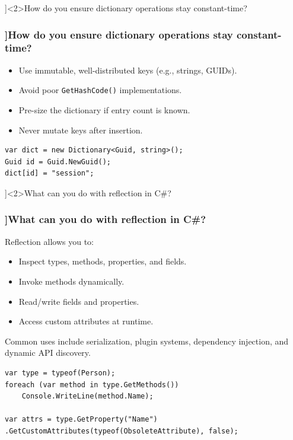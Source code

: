 \QuestionSlide[\CategoryBadge[CollColor!20]{Collections}]<2>{How do you ensure dictionary operations stay constant-time?}
\begin{frame}[fragile]
  \frametitle{\AnswerTitle[\CategoryBadge[CollColor!20]{Collections}]{How do you ensure dictionary operations stay constant-time?}}

  {\footnotesize
    \begin{itemize}
      \item Use immutable, well-distributed keys (e.g., strings, GUIDs).
      \item Avoid poor \texttt{GetHashCode()} implementations.
      \item Pre-size the dictionary if entry count is known.
      \item Never mutate keys after insertion.
    \end{itemize}
  }

  \begin{verbatim}
var dict = new Dictionary<Guid, string>();
Guid id = Guid.NewGuid();
dict[id] = "session";
  \end{verbatim}
\end{frame}

\QuestionSlide[\CategoryBadge[MetaColor!20]{Metaprogramming}]<2>{What can you do with reflection in C\#?}
\begin{frame}[fragile]
  \frametitle{\AnswerTitle[\CategoryBadge[MetaColor!20]{Metaprogramming}]{What can you do with reflection in C\#?}}

  {\footnotesize
    Reflection allows you to:
    \begin{itemize}
      \item Inspect types, methods, properties, and fields.
      \item Invoke methods dynamically.
      \item Read/write fields and properties.
      \item Access custom attributes at runtime.
    \end{itemize}
    Common uses include serialization, plugin systems, dependency injection, and dynamic API discovery.
  }

  \begin{verbatim}
var type = typeof(Person);
foreach (var method in type.GetMethods())
    Console.WriteLine(method.Name);

var attrs = type.GetProperty("Name")
.GetCustomAttributes(typeof(ObsoleteAttribute), false);
  \end{verbatim}
\end{frame}

